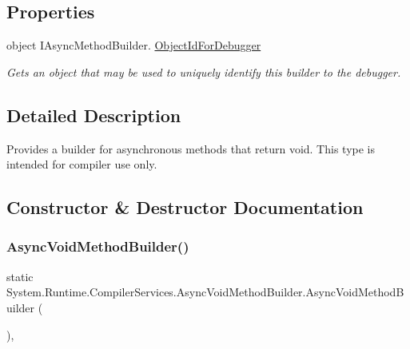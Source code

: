 \subsection*{Properties}
\begin{DoxyCompactItemize}
\item 
object I\+Async\+Method\+Builder. \hyperlink{struct_system_1_1_runtime_1_1_compiler_services_1_1_async_void_method_builder_a747b2a2fc6e09e415117f6610c5b9f21}{Object\+Id\+For\+Debugger}
\begin{DoxyCompactList}\small\item\em Gets an object that may be used to uniquely identify this builder to the debugger. \end{DoxyCompactList}\end{DoxyCompactItemize}


\subsection{Detailed Description}
Provides a builder for asynchronous methods that return void. This type is intended for compiler use only. 



\subsection{Constructor \& Destructor Documentation}
\mbox{\label{struct_system_1_1_runtime_1_1_compiler_services_1_1_async_void_method_builder_a59bcbc32c01ba5cc5247fc9f2be62fd1}} 
\subsubsection{\texorpdfstring{Async\+Void\+Method\+Builder()}{AsyncVoidMethodBuilder()}}
{\footnotesize\ttfamily static System.\+Runtime.\+Compiler\+Services.\+Async\+Void\+Method\+Builder.\+Async\+Void\+Method\+Builder (\begin{DoxyParamCaption}{ }\end{DoxyParamCaption})\hspace{0.3cm}{\ttfamily [inline]}, {\ttfamily [static]}}



